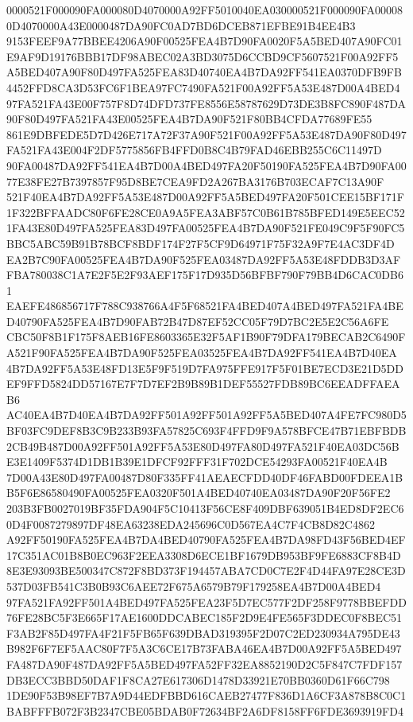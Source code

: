 \documentclass[UTF8,fontset=fandol,zihao=-4,a4paper]{ctexart}
\begin{document}
{{0000521F000090FA000080D4070000A92FF5010040EA030000521F000090FA000080D4070000A43E0000487DA90FC0AD7BD6DCEB871EFBE91B4EE4B3
9153FEEF9A77BBEE4206A90F00525FEA4B7D90FA0020F5A5BED407A90FC01E9AF9D19176BBB17DF98ABEC02A3BD3075D6CCBD9CF5607521F00A92FF5
A5BED407A90F80D497FA525FEA83D40740EA4B7DA92FF541EA0370DFB9FB4452FFD8CA3D53FC6F1BEA97FC7490FA521F00A92FF5A53E487D00A4BED4
97FA521FA43E00F757F8D74DFD737FE8556E58787629D73DE3B8FC890F487DA90F80D497FA521FA43E00525FEA4B7DA90F521F80BB4CFDA77689FE55
861E9DBFEDE5D7D426E717A72F37A90F521F00A92FF5A53E487DA90F80D497FA521FA43E004F2DF5775856FB4FFD0B8C4B79FAD46EBB255C6C11497D
90FA00487DA92FF541EA4B7D00A4BED497FA20F50190FA525FEA4B7D90FA0077E38FE27B7397857F95D8BE7CEA9FD2A267BA3176B703ECAF7C13A90F
521F40EA4B7DA92FF5A53E487D00A92FF5A5BED497FA20F501CEE15BF171F1F322BFFAADC80F6FE28CE0A9A5FEA3ABF57C0B61B785BFED149E5EEC52
1FA43E80D497FA525FEA83D497FA00525FEA4B7DA90F521FE049C9F5F90FC5BBC5ABC59B91B78BCF8BDF174F27F5CF9D64971F75F32A9F7E4AC3DF4D
EA2B7C90FA00525FEA4B7DA90F525FEA03487DA92FF5A53E48FDDB3D3AFFBA780038C1A7E2F5E2F93AEF175F17D935D56BFBF790F79BB4D6CAC0DB61
EAEFE486856717F788C938766A4F5F68521FA4BED407A4BED497FA521FA4BED40790FA525FEA4B7D90FAB72B47D87EF52CC05F79D7BC2E5E2C56A6FE
CBC50F8B1F175F8AEB16FE8603365E32F5AF1B90F79DFA179BECAB2C6490FA521F90FA525FEA4B7DA90F525FEA03525FEA4B7DA92FF541EA4B7D40EA
4B7DA92FF5A53E48FD13E5F9F519D7FA975FFE917F5F01BE7ECD3E21D5DDEF9FFD5824DD57167E7F7D7EF2B9B89B1DEF55527FDB89BC6EEADFFAEAB6
AC40EA4B7D40EA4B7DA92FF501A92FF501A92FF5A5BED407A4FE7FC980D5BF03FC9DEF8B3C9B233B93FA57825C693F4FFD9F9A578BFCE47B71EBFBDB
2CB49B487D00A92FF501A92FF5A53E80D497FA80D497FA521F40EA03DC56BE3E1409F5374D1DB1B39E1DFCF92FFF31F702DCE54293FA00521F40EA4B
7D00A43E80D497FA00487D80F335FF41AEAECFDD40DF46FABD00FDEEA1BB5F6E86580490FA00525FEA0320F501A4BED40740EA03487DA90F20F56FE2
203B3FB0027019BF35FDA904F5C10413F56CE8F409DBF639051B4ED8DF2EC60D4F0087279897DF48EA63238EDA245696C0D567EA4C7F4CB8D82C4862
A92FF50190FA525FEA4B7DA4BED40790FA525FEA4B7DA98FD43F56BED4EF17C351AC01B8B0EC963F2EEA3308D6ECE1BF1679DB953BF9FE6883CF8B4D
8E3E93093BE500347C872F8BD373F194457ABA7CD0C7E2F4D44FA97E28CE3D537D03FB541C3B0B93C6AEE72F675A6579B79F179258EA4B7D00A4BED4
97FA521FA92FF501A4BED497FA525FEA23F5D7EC577F2DF258F9778BBEFDD76FE28BC5F3E665F17AE1600DDCABEC185F2D9E4FE565F3DDEC0F8BEC51
F3AB2F85D497FA4F21F5FB65F639DBAD319395F2D07C2ED230934A795DE43B982F6F7EF5AAC80F7F5A3C6CE17B73FABA46EA4B7D00A92FF5A5BED497
FA487DA90F487DA92FF5A5BED497FA52FF32EA8852190D2C5F847C7FDF157DB3ECC3BBD50DAF1F8CA27E617306D1478D33921E70BB0360D61F66C798
1DE90F53B98EF7B7A9D44EDFBBD616CAEB27477F836D1A6CF3A878B8C0C1BABFFFB072F3B2347CBE05BDAB0F72634BF2A6DF8158FF6FDE3693919FD4
}}
\end{document}
